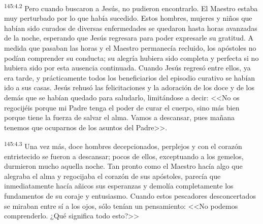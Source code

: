 \par 
\textsuperscript{145:4.2} Pero cuando buscaron a Jesús, no pudieron encontrarlo. El Maestro estaba muy perturbado por lo que había sucedido. Estos hombres, mujeres y niños que habían sido curados de diversas enfermedades se quedaron hasta horas avanzadas de la noche, esperando que Jesús regresara para poder expresarle su gratitud. A medida que pasaban las horas y el Maestro permanecía recluido, los apóstoles no podían comprender su conducta; su alegría hubiera sido completa y perfecta si no hubiera sido por esta ausencia continuada. Cuando Jesús regresó entre ellos, ya era tarde, y prácticamente todos los beneficiarios del episodio curativo se habían ido a sus casas. Jesús rehusó las felicitaciones y la adoración de los doce y de los demás que se habían quedado para saludarlo, limitándose a decir: <<No os regocijéis porque mi Padre tenga el poder de curar el cuerpo, sino más bien porque tiene la fuerza de salvar el alma. Vamos a descansar, pues mañana tenemos que ocuparnos de los asuntos del Padre>>.

\par 
\textsuperscript{145:4.3} Una vez más, doce hombres decepcionados, perplejos y con el corazón entristecido se fueron a descansar; pocos de ellos, exceptuando a los gemelos, durmieron mucho aquella noche. Tan pronto como el Maestro hacía algo que alegraba el alma y regocijaba el corazón de sus apóstoles, parecía que inmediatamente hacía añicos sus esperanzas y demolía completamente los fundamentos de su coraje y entusiasmo. Cuando estos pescadores desconcertados se miraban entre sí a los ojos, sólo tenían un pensamiento: <<No podemos comprenderlo. ¿Qué significa todo esto?>>


